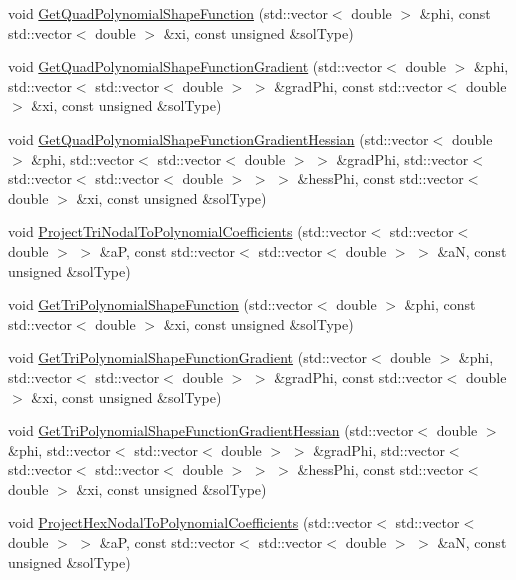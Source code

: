 \begin{DoxyCompactItemize}
\item 
void \mbox{\hyperlink{namespacefemus_ae2bcb04cc922daa697c7bf79bfe513ad}{Get\+Quad\+Polynomial\+Shape\+Function}} (std\+::vector$<$ double $>$ \&phi, const std\+::vector$<$ double $>$ \&xi, const unsigned \&sol\+Type)
\item 
void \mbox{\hyperlink{namespacefemus_a580971c4603abf2e862f38425291afdf}{Get\+Quad\+Polynomial\+Shape\+Function\+Gradient}} (std\+::vector$<$ double $>$ \&phi, std\+::vector$<$ std\+::vector$<$ double $>$ $>$ \&grad\+Phi, const std\+::vector$<$ double $>$ \&xi, const unsigned \&sol\+Type)
\item 
void \mbox{\hyperlink{namespacefemus_a94873c1c0c41bf06892b4b1c8208d34e}{Get\+Quad\+Polynomial\+Shape\+Function\+Gradient\+Hessian}} (std\+::vector$<$ double $>$ \&phi, std\+::vector$<$ std\+::vector$<$ double $>$ $>$ \&grad\+Phi, std\+::vector$<$ std\+::vector$<$ std\+::vector$<$ double $>$ $>$ $>$ \&hess\+Phi, const std\+::vector$<$ double $>$ \&xi, const unsigned \&sol\+Type)
\item 
void \mbox{\hyperlink{namespacefemus_a9b37c908983e9f07e8aa7d6a56862eee}{Project\+Tri\+Nodal\+To\+Polynomial\+Coefficients}} (std\+::vector$<$ std\+::vector$<$ double $>$ $>$ \&aP, const std\+::vector$<$ std\+::vector$<$ double $>$ $>$ \&aN, const unsigned \&sol\+Type)
\item 
void \mbox{\hyperlink{namespacefemus_a7b644f5f847656f51ce364a2d101a5d8}{Get\+Tri\+Polynomial\+Shape\+Function}} (std\+::vector$<$ double $>$ \&phi, const std\+::vector$<$ double $>$ \&xi, const unsigned \&sol\+Type)
\item 
void \mbox{\hyperlink{namespacefemus_ab62adc71e5f5c682a2590ebc0cdc0a5a}{Get\+Tri\+Polynomial\+Shape\+Function\+Gradient}} (std\+::vector$<$ double $>$ \&phi, std\+::vector$<$ std\+::vector$<$ double $>$ $>$ \&grad\+Phi, const std\+::vector$<$ double $>$ \&xi, const unsigned \&sol\+Type)
\item 
void \mbox{\hyperlink{namespacefemus_a5a10776bad6d5e3320121c6b6d9ef723}{Get\+Tri\+Polynomial\+Shape\+Function\+Gradient\+Hessian}} (std\+::vector$<$ double $>$ \&phi, std\+::vector$<$ std\+::vector$<$ double $>$ $>$ \&grad\+Phi, std\+::vector$<$ std\+::vector$<$ std\+::vector$<$ double $>$ $>$ $>$ \&hess\+Phi, const std\+::vector$<$ double $>$ \&xi, const unsigned \&sol\+Type)
\item 
void \mbox{\hyperlink{namespacefemus_ae9be992fdb8ec064af9414b8a4ca4559}{Project\+Hex\+Nodal\+To\+Polynomial\+Coefficients}} (std\+::vector$<$ std\+::vector$<$ double $>$ $>$ \&aP, const std\+::vector$<$ std\+::vector$<$ double $>$ $>$ \&aN, const unsigned \&sol\+Type)

\end{DoxyCompactItemize}
